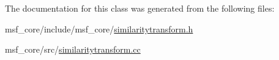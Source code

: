 The documentation for this class was generated from the following files\-:\begin{DoxyCompactItemize}
\item 
msf\-\_\-core/include/msf\-\_\-core/\hyperlink{similaritytransform_8h}{similaritytransform.\-h}\item 
msf\-\_\-core/src/\hyperlink{similaritytransform_8cc}{similaritytransform.\-cc}\end{DoxyCompactItemize}
